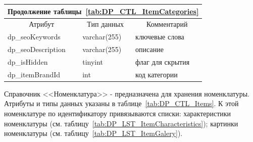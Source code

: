 \begin{table}[!htb]
    \centering\small


    \begin{tabular}{|p{5cm}|p{2.5cm}|p{9cm}|}
        \multicolumn{3}{c}{\normalsize Продолжение таблицы~\ref{tab:DP_CTL_ItemCategories}} \\

        \hline
        \multicolumn{1}{|c|}{Атрибут}
        & \multicolumn{1}{c|}{Тип данных}
        & \multicolumn{1}{c|}{Комментарий}
        \\ \hline

        dp\_seoKeywords & varchar(255) & ключевые слова \\ \hline
        dp\_seoDescription & varchar(255) & описание \\ \hline
        dp\_isHidden & tinyint & флаг для скрытия \\ \hline
        dp\_itemBrandId & int & код категории \\ \hline
    \end{tabular}
\end{table}

Справочник <<Номенклатура>> - предназначена для хранения номенклатуры.
Атрибуты и типы данных указаны в таблице~\ref{tab:DP_CTL_Items}.
К этой номенклатуре по идентификатору привязываются списки:
характеристики номенклатуры (см. таблицу~\ref{tab:DP_LST_ItemCharacteristics});
картинки номенклатуры (см. таблицу~\ref{tab:DP_LST_ItemGalery}).

